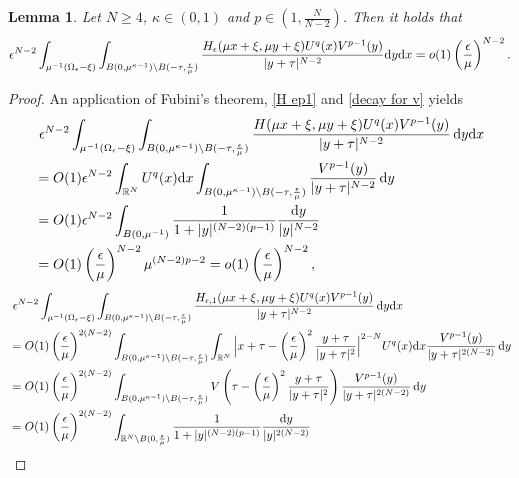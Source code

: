 \documentclass[reqno]{amsart}
\newtheorem{lemma}[theorem]{Lemma}
\theoremstyle{remark}
\newcommand{\ep}{\epsilon}
\newcommand{\R}{\mathbb{R}}
\newcommand{\mone}{\mathbf{1}}
\newcommand{\dx}{\textup{d}x}
\newcommand{\dy}{\textup{d}y}
\renewcommand{\(}{\left(}
\renewcommand{\)}{\right)}
\numberwithin{equation}{section}
\begin{document}
\begin{lemma}\label{reg part ene est}
Let $N \ge 4$, $\kappa\in (0,1)$ and $p \in (1,\frac{N}{N-2})$. Then it holds that
\begin{equation}\label{reg part ene est eq}
\ep^{N-2} \int_{\mu^{-1}(\Omega_\ep-\xi)} \int_{B(0,\mu^{\kappa-1})\setminus B(-\tau,\frac{\ep}{\mu})} \frac{H_\ep(\mu x+\xi,\mu y+\xi)U^q(x) V^{p-1}(y)}{|y+\tau|^{N-2}} \dy\dx
= o(1) \(\frac{\ep}{\mu}\)^{N-2}.
\end{equation}
\end{lemma}
\begin{proof}
An application of Fubini's theorem, \eqref{H ep1} and \eqref{decay for v} yields
\begin{align*}
&\ \ep^{N-2} \int_{\mu^{-1}(\Omega_\ep-\xi)} \int_{B(0,\mu^{\kappa-1})\setminus B(-\tau,\frac{\ep}{\mu})} \frac{H (\mu x+\xi,\mu y+\xi) U^q(x) V^{p-1}(y)}{|y+\tau|^{N-2}}\, \dy\dx \\
&= O(1)\ep^{N-2} \int_{\R^N} U^q(x)\dx \int_{B(0,\mu^{\kappa-1})\setminus B(-\tau,\frac{\ep}{\mu})} \frac{V^{p-1}(y)}{|y+\tau|^{N-2}}\, \dy \\
&= O(1)\ep^{N-2} \int_{B(0,\mu^{-1})} \frac{1}{1+|y|^{(N-2)(p-1)}}\frac{\dy}{|y|^{N-2}} \\ %
&= O(1)\(\frac{\ep}{\mu}\)^{N-2}\mu^{(N-2)p-2} = o(1)\(\frac{\ep}{\mu}\)^{N-2},
\end{align*}
\begin{align*}
&\ \ep^{N-2} \int_{\mu^{-1}(\Omega_\ep-\xi)} \int_{B(0,\mu^{\kappa-1})\setminus B(-\tau,\frac{\ep}{\mu})} \frac{H_{\ep,1}(\mu x+\xi,\mu y+\xi)U^q(x) V^{p-1}(y)}{|y+\tau|^{N-2}}\, \dy\dx \\
&= O(1)\(\frac{\ep}{\mu}\)^{2(N-2)} \int_{B(0,\mu^{\kappa-1})\setminus B(-\tau,\frac{\ep}{\mu})}\int_{\R^N}\Big|x+\tau-\(\frac{\ep}{\mu}\)^2\frac{y+\tau}{|y+\tau|^2}\Big|^{2-N}U^q(x)\dx \frac{V^{p-1}(y)}{|y+\tau|^{2(N-2)}}\, \dy \\
&= O(1)\(\frac{\ep}{\mu}\)^{2(N-2)} \int_{B(0,\mu^{\kappa-1})\setminus B(-\tau,\frac{\ep}{\mu})} V\(\tau-\(\frac{\ep}{\mu}\)^2\frac{y+\tau}{|y+\tau|^2}\) \frac{V^{p-1}(y)}{|y+\tau|^{2(N-2)}}\, \dy \\
&= O(1)\(\frac{\ep}{\mu}\)^{2(N-2)} \int_{\R^N\setminus B(0,\frac{\ep}{\mu})} \frac{1}{1+|y|^{(N-2)(p-1)}} \frac{\dy}{|y|^{2(N-2)}}

\end{align*}
\end{proof}
\end{document}
